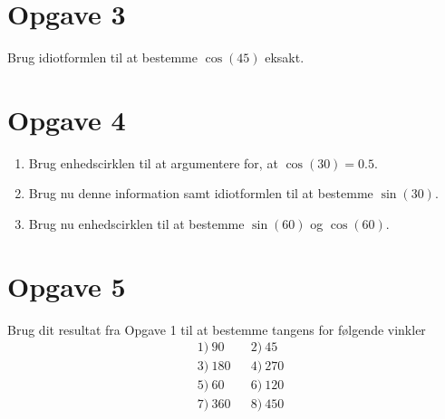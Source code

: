 \section*{Opgave 3}
Brug idiotformlen til at bestemme $\cos(45)$ eksakt.

\section*{Opgave 4}
\begin{enumerate}[label=\roman*)]
\item Brug enhedscirklen til at argumentere for, at $\cos(30) = 0.5$.
\item Brug nu denne information samt idiotformlen til at bestemme $\sin(30)$.
\item Brug nu enhedscirklen til at bestemme $\sin(60)$ og $\cos(60)$. 

\end{enumerate}

\section*{Opgave 5}
Brug dit resultat fra Opgave 1 til at bestemme tangens for følgende vinkler
\begin{align*}
&1) \ 90  &&2) \ 45   \\
&3) \ 180   &&4) \ 270   \\
&5) \ 60  &&6) \ 120   \\
&7) \ 360  &&8) \ 450   \\
\end{align*}
